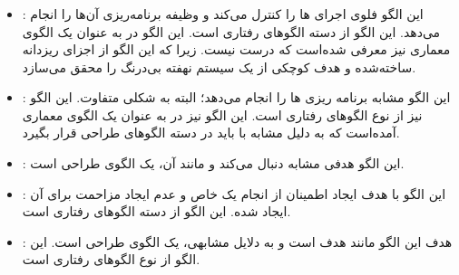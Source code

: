 \subsubsection{}
\begin{itemize}
\item {}: %
این الگو فلوی اجرای ها را کنترل می‌کند
و وظیفه برنامه‌ریزی آن‌ها را انجام می‌دهد. این الگو از دسته الگوهای رفتاری
است. این الگو در \cite{ref4} به عنوان یک الگوی
معماری نیز معرفی شده‌است که درست نیست. زیرا که این الگو
از اجزای ریزدانه ساخته‌شده و هدف کوچکی از یک سیستم نهفته بی‌درنگ
را محقق می‌سازد.
\item {}: %
این الگو مشابه 
برنامه ریزی ها را انجام می‌دهد؛ البته به شکلی متفاوت.
این الگو نیز از نوع الگوهای رفتاری است. این الگو نیز در \cite{ref4}
به عنوان یک الگوی معماری آمده‌است که به دلیل مشابه با
 باید در دسته
الگوهای طراحی قرار بگیرد.
\item {}: %
این الگو هدفی مشابه 
دنبال می‌کند و مانند آن، یک الگوی طراحی است.
\item {}: %
این الگو با هدف ایجاد اطمینان از انجام یک  خاص
و عدم ایجاد مزاحمت برای آن ایجاد شده. این الگو از دسته الگوهای رفتاری است.
\item {}: %
هدف این الگو مانند هدف 
است و به دلایل مشابهی، یک الگوی طراحی است. این الگو از نوع الگوهای
رفتاری است.
\end{itemize}


